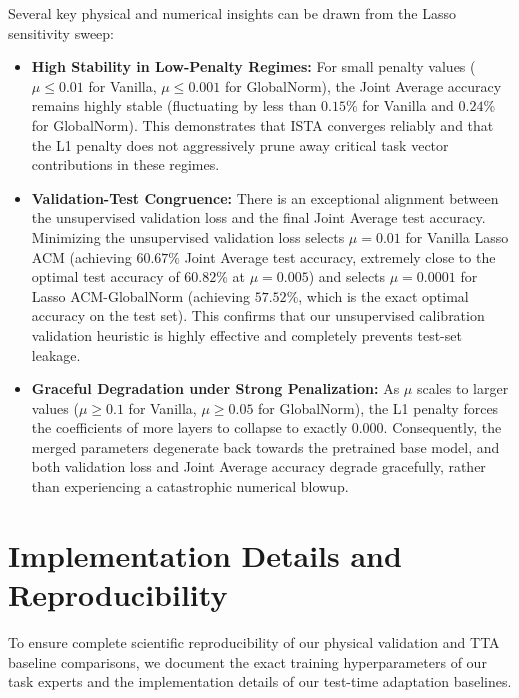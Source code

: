 Several key physical and numerical insights can be drawn from the Lasso sensitivity sweep:
\begin{itemize}
    \item \textbf{High Stability in Low-Penalty Regimes:} For small penalty values ($\mu \le 0.01$ for Vanilla, $\mu \le 0.001$ for GlobalNorm), the Joint Average accuracy remains highly stable (fluctuating by less than $0.15\%$ for Vanilla and $0.24\%$ for GlobalNorm). This demonstrates that ISTA converges reliably and that the L1 penalty does not aggressively prune away critical task vector contributions in these regimes.
    \item \textbf{Validation-Test Congruence:} There is an exceptional alignment between the unsupervised validation loss and the final Joint Average test accuracy. Minimizing the unsupervised validation loss selects $\mu = 0.01$ for Vanilla Lasso ACM (achieving $60.67\%$ Joint Average test accuracy, extremely close to the optimal test accuracy of $60.82\%$ at $\mu = 0.005$) and selects $\mu = 0.0001$ for Lasso ACM-GlobalNorm (achieving $57.52\%$, which is the exact optimal accuracy on the test set). This confirms that our unsupervised calibration validation heuristic is highly effective and completely prevents test-set leakage.
    \item \textbf{Graceful Degradation under Strong Penalization:} As $\mu$ scales to larger values ($\mu \ge 0.1$ for Vanilla, $\mu \ge 0.05$ for GlobalNorm), the L1 penalty forces the coefficients of more layers to collapse to exactly $0.000$. Consequently, the merged parameters degenerate back towards the pretrained base model, and both validation loss and Joint Average accuracy degrade gracefully, rather than experiencing a catastrophic numerical blowup.
\end{itemize}

\section{Implementation Details and Reproducibility}
\label{app:reproducibility}

To ensure complete scientific reproducibility of our physical validation and TTA baseline comparisons, we document the exact training hyperparameters of our task experts and the implementation details of our test-time adaptation baselines.

